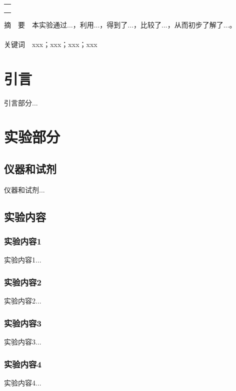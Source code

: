 \documentclass[12pt]{article}
\begin{document}
\begin{titlepage}
\begin{center}
\begin{tabular}{cp{5cm}}
                \cline{2-2}
            \end{tabular}
            \begin{tabular*}{\textwidth}{c}
                \\ %
                \\ %
                \\ %
                \\ %
                \hline %
            \end{tabular*}
        \end{center}
        \textsf{\textcolor{BrickRed}{摘\ \ 要}}\ \ 本实验通过...，利用...，得到了...，比较了...，从而初步了解了...。
        \\
        \\
        \textsf{\textcolor{BrickRed}{关键词}}\ \ xxx；xxx；xxx；xxx
    \end{titlepage}

    \section{引言}
	引言部分...
               
	\vbox{} %
	     
    \section{实验部分}
    	\subsection{仪器和试剂}
    		仪器和试剂...
    			
    	 \subsection{实验内容}
			\subsubsection{实验内容1}
				实验内容1...
			\subsubsection{实验内容2}
				实验内容2...
			\subsubsection{实验内容3}
				实验内容3...
			\subsubsection{实验内容4}
				实验内容4...
\end{document}
